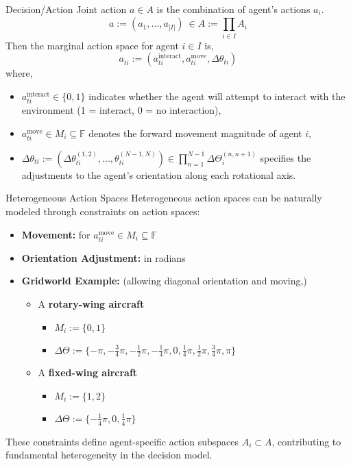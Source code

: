 \begin{frame}{Decision/Action}
    Joint action \(a \in A\) is the combination of agent's actions \(a_i\).
    \[
        a := \left(a_{1}, \ldots, a_{|I|}\right) \ \in A := \prod_{i\in I}^{} A_i
    \]
    Then the marginal action space for agent \(i\in I\) is,
    \[
        a_{ti}^{} := (a_{ti}^\text{interact},a_{ti}^\text{move},\Delta\theta_{ti})
    \]
    where,
    \begin{itemize}
        \item \(a_{ti}^\text{interact} \in \{0,1\}\) indicates whether the agent will attempt 
            to interact with the environment (1 = interact, 0 = no interaction),
        \item \(a_{ti}^\text{move} \in M_i \subseteq \mathbb{F}\) 
            denotes the forward movement magnitude of agent \(i\),
        \item \(\Delta\theta_{ti} := \left(\Delta\theta_{ti}^{(1,2)},\ldots, 
            \theta_{ti}^{(N-1,N)}\right) \in \prod_{n=1}^{N-1} \Delta\Theta_{i}^{(n,n+1)}\) 
            specifies the adjustments to the agent's orientation along each rotational axis.
    \end{itemize}
\end{frame}

\begin{frame}{Heterogeneous Action Spaces}
    Heterogeneous action spaces can be naturally modeled through constraints on action spaces:
    \begin{itemize}
        \item \textbf{Movement:} for \(a_{ti}^\text{move} \in M_i \subseteq \mathbb{F}\)
        \item \textbf{Orientation Adjustment:} in radians
        \item \textbf{Gridworld Example:} (allowing diagonal orientation and moving,)
        \begin{itemize}
            \item A \textbf{rotary-wing aircraft} 
            \begin{itemize}
                \item \(M_i := \{0,1\}\)
                \item \(\Delta\Theta := \{-\pi, -\frac{3}{4}\pi,  -\frac{1}{2}\pi, -\frac{1}{4}\pi, 0, \frac{1}{4}\pi,  \frac{1}{2}\pi, \frac{3}{4}\pi, \pi\}\)
            \end{itemize}
            \item A \textbf{fixed-wing aircraft}
            \begin{itemize}
                \item \(M_i := \{1,2\}\)
                \item \(\Delta\Theta := \{-\frac{1}{4}\pi, 0, \frac{1}{4}\pi\}\)
            \end{itemize}
        \end{itemize}
    \end{itemize}
    These constraints define agent-specific action subspaces \( A_i \subset A \), 
    contributing to fundamental heterogeneity in the decision model.
\end{frame}



